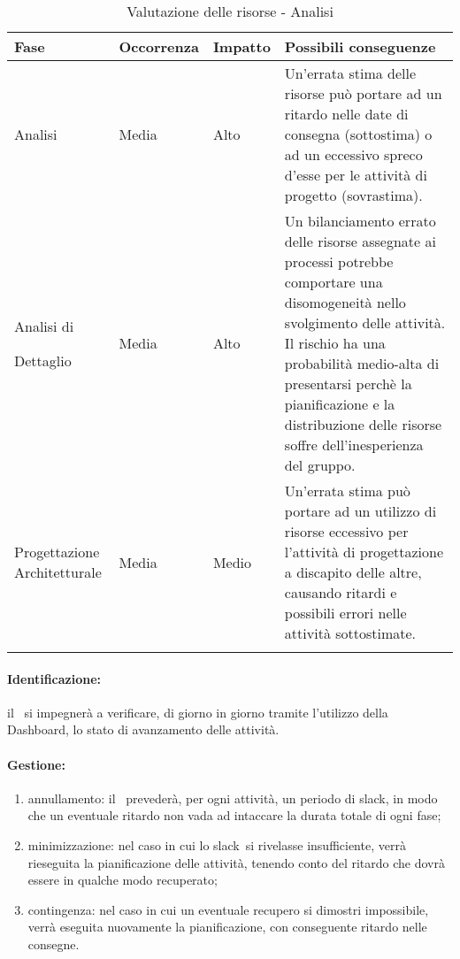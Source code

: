 \documentclass[../PianoProgetto.tex]{subfiles}
\begin{document}
	\begin{table}[h]
		\centering
		\begin{tabularx}{\textwidth}{F O O P}
			\toprule
			\textbf{Fase} & \textbf{Occorrenza} & \textbf{Impatto} & \textbf{Possibili conseguenze}\\
			\midrule
			Analisi & Media & Alto & Un'errata stima delle risorse può portare ad un ritardo nelle date di consegna (sottostima) o ad un eccessivo spreco d'esse per le attività di progetto (sovrastima). \\
			\midrule
			Analisi di \par Dettaglio & Media & Alto & Un bilanciamento errato delle risorse assegnate ai processi potrebbe comportare una disomogeneità nello svolgimento delle attività. Il rischio ha una probabilità medio-alta di presentarsi perchè la pianificazione e la distribuzione delle risorse soffre dell'inesperienza del gruppo. \\
			\midrule
			Progettazione Architetturale & Media & Medio & Un'errata stima può portare ad un utilizzo di risorse eccessivo per l'attività di progettazione a discapito delle altre, causando ritardi e possibili errori nelle attività sottostimate. \\
			\bottomrule
		\end{tabularx}
		\caption{Valutazione delle risorse - Analisi}
		\label{tab:Valutazione delle risorse - Analisi}	
	\end{table}
	
	\paragraph*{Identificazione:} il \responsabilediprogetto\ si impegnerà a verificare, di giorno in giorno tramite l'utilizzo della Dashboard\g, lo stato di avanzamento delle attività.
	
	\paragraph*{Gestione:}
	\begin{enumerate}
		\item annullamento: il \responsabilediprogetto\ prevederà, per ogni attività, un periodo di slack\g, in modo che un eventuale ritardo non vada ad intaccare la durata totale di ogni fase\g ;
		\item minimizzazione: nel caso in cui lo slack\g\ si rivelasse insufficiente, verrà rieseguita la pianificazione delle attività, tenendo conto del ritardo che dovrà essere in qualche modo recuperato;
		\item contingenza: nel caso in cui un eventuale recupero si dimostri impossibile, verrà eseguita nuovamente la pianificazione, con conseguente ritardo nelle consegne.
	\end{enumerate}	
	
\end{document}
